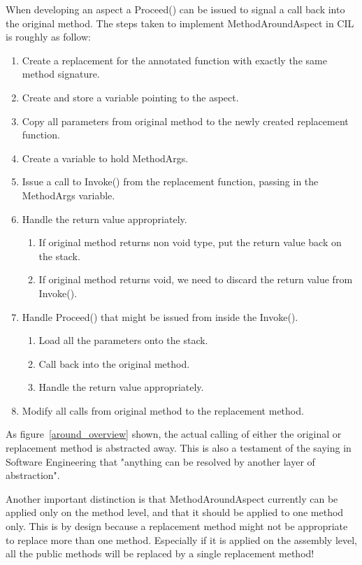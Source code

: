 When developing an aspect a Proceed() can be issued to signal a call back into the original method. The steps taken to implement MethodAroundAspect in CIL is roughly as follow:

\begin{enumerate}
	\item Create a replacement for the annotated function with exactly the same method signature.
	\item Create and store a variable pointing to the aspect.
	\item Copy all parameters from original method to the newly created replacement function.
	\item Create a variable to hold MethodArgs.
	\item Issue a call to Invoke() from the replacement function, passing in the MethodArgs variable.
	\item Handle the return value appropriately.
	\begin{enumerate}
		\item If original method returns non void type, put the return value back on the stack.
		\item If original method returns void, we need to discard the return value from Invoke().
	\end{enumerate}
	\item Handle Proceed() that might be issued from inside the Invoke().
	\begin{enumerate}
		\item Load all the parameters onto the stack.
		\item Call back into the original method.
		\item Handle the return value appropriately.
	\end{enumerate}
	\item Modify all calls from original method to the replacement method.
\end{enumerate}

As figure~\ref{around_overview} shown, the actual calling of either the original or replacement method is abstracted away. This is also a testament of the saying in Software Engineering that "anything can be resolved by another layer of abstraction".

Another important distinction is that MethodAroundAspect currently can be applied only on the method level, and that it should be applied to one method only. This is by design because a replacement method might not be appropriate to replace more than one method. Especially if it is applied on the assembly level, all the public methods will be replaced by a single replacement method!

